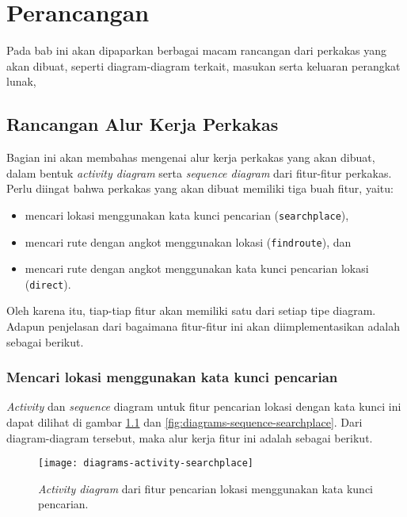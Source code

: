 \chapter{Perancangan}
\label{chap:design}

Pada bab ini akan dipaparkan berbagai macam rancangan dari perkakas \cl yang akan dibuat, seperti diagram-diagram terkait, masukan serta keluaran perangkat lunak,

\section{Rancangan Alur Kerja Perkakas}
\label{sec:design-flow}

Bagian ini akan membahas mengenai alur kerja perkakas yang akan dibuat, dalam bentuk \textit{activity diagram} serta \textit{sequence diagram} dari fitur-fitur perkakas. Perlu diingat bahwa perkakas yang akan dibuat memiliki tiga buah fitur, yaitu:

\begin{itemize}
	\item mencari lokasi menggunakan kata kunci pencarian (\verb|searchplace|),
	\item mencari rute dengan angkot menggunakan \latlon lokasi (\verb|findroute|), dan
	\item mencari rute dengan angkot menggunakan kata kunci pencarian lokasi (\verb|direct|).
\end{itemize}

\noindent
Oleh karena itu, tiap-tiap fitur akan memiliki satu dari setiap tipe diagram. Adapun penjelasan dari bagaimana fitur-fitur ini akan diimplementasikan adalah sebagai berikut.


\subsection{Mencari lokasi menggunakan kata kunci pencarian}
\label{sec:design-flow-searchplace}

\textit{Activity} dan \textit{sequence} diagram untuk fitur pencarian lokasi dengan kata kunci ini dapat dilihat di gambar \ref{fig:diagrams-activity-searchplace} dan \ref{fig:diagrams-sequence-searchplace}. Dari diagram-diagram tersebut, maka alur kerja fitur ini adalah sebagai berikut.

\begin{figure}[ht]
    \centering
    \texttt{[image: diagrams-activity-searchplace]}
    \caption[\textit{Activity diagram} fitur pencarian lokasi menggunakan kata kunci lokasi]{\textit{Activity diagram} dari fitur pencarian lokasi menggunakan kata kunci pencarian.}
    \label{fig:diagrams-activity-searchplace}
\end{figure}

